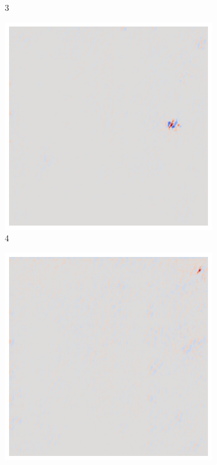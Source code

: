 \begin{figure}[ht!]
\begin{subfigure}{0.095\linewidth}
        \caption{3}
    \end{subfigure}\hfill%
    \begin{subfigure}{0.095\linewidth}
        \centering
        \includegraphics[height=1\linewidth]{01-images/05-resultate/uap_resnet/uap0-resnet18-covid-n200-robustificationslevel4.png}
        \caption{4}
    \end{subfigure}\hfill%
    \begin{subfigure}{0.095\linewidth}
        \centering
        \includegraphics[height=1\linewidth]{01-images/05-resultate/uap_resnet/uap0-resnet18-covid-n200-robustificationslevel5.png}

\end{subfigure}
\end{figure}

